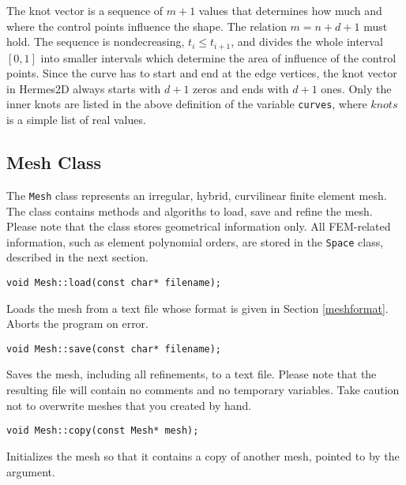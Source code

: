 The knot vector is a sequence of $m+1$ values that determines how much and where the
control points influence the shape. The relation $m = n+d+1$ must hold. The sequence is
nondecreasing, $t_i \leq t_{i+1}$, and divides the whole interval $[0,1]$ into smaller
intervals which determine the area of influence of the control points. Since the curve
has to start and end at the edge vertices, the knot vector in Hermes2D always starts
with $d+1$ zeros and ends with $d+1$ ones. Only the inner knots are listed in the 
above definition of the variable {\tt curves}, where $knots$ is a simple list of real values.

\label{sec:nurbs}




\subsection{Mesh Class}

\newcommand{\desc}[1]{
  \vspace{-0.9ex}
  \hangindent=4mm \hangafter=0
  #1
}

The {\tt Mesh} class represents an irregular, hybrid, curvilinear finite element mesh.
The class contains methods and algoriths to load, save and refine the mesh. Please
note that the class stores geometrical information only. All FEM-related information, 
such as element polynomial orders, are stored in the {\tt Space} class, described in
the next section.

\medskip
\begin{lstlisting}
void Mesh::load(const char* filename);
\end{lstlisting} 
\desc{Loads the mesh from a text file whose format is given in Section \ref{meshformat}.
Aborts the program on error.}


\medskip
\begin{lstlisting}
void Mesh::save(const char* filename);
\end{lstlisting}
\desc{Saves the mesh, including all refinements, to a text file. Please note that the resulting
file will contain no comments and no temporary variables. Take caution not to overwrite
meshes that you created by hand.}


\medskip
\begin{lstlisting}
void Mesh::copy(const Mesh* mesh);
\end{lstlisting}
\desc{Initializes the mesh so that it contains a copy of another mesh, pointed to by the argument.}


